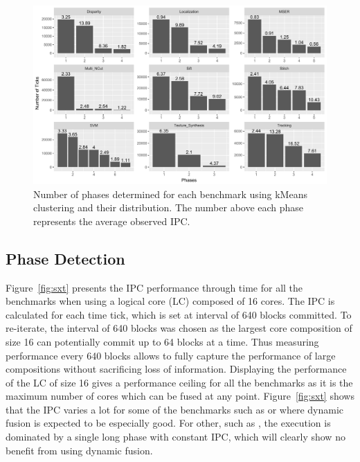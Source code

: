 \begin{figure}[t]
    \centering
    \includegraphics[width=1\textwidth]{cases-paper/graphics/Exploration/clusters4.pdf}
    \caption{Number of phases determined for each benchmark using kMeans clustering and their distribution. The number above each phase represents the average observed IPC.}
    \label{fig:clust}
		\vspace{1em}
\end{figure}


\subsection{Phase Detection}
Figure~\ref{fig:sxt} presents the IPC performance through time for all the benchmarks when using a logical core (LC) composed of 16 cores.
The IPC is calculated for each time tick, which is set at interval of 640 blocks committed.
To re-iterate, the interval of 640 blocks was chosen as the largest core composition of size 16 can potentially commit up to 64 blocks at a time.
Thus measuring performance every 640 blocks allows to fully capture the performance of large compositions without sacrificing loss of information.
Displaying the performance of the LC of size 16 gives a performance ceiling for all the benchmarks as it is the maximum number of cores which can be fused at any point.
Figure~\ref{fig:sxt} shows that the IPC varies a lot for some of the benchmarks such as  or  where dynamic fusion is expected to be especially good.
For other, such as , the execution is dominated by a single long phase with constant IPC, which will clearly show no benefit from using dynamic fusion.

